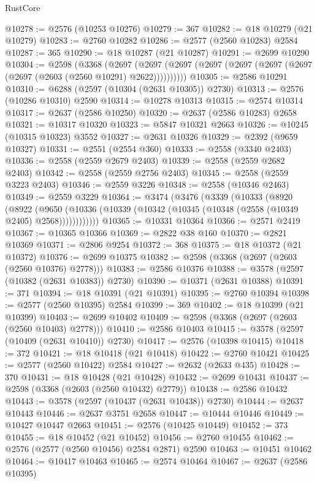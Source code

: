 \begin{lexlean}{RustCore}
\begin{coremodule}
@10278 := @2576 (@10253 @10276)
@10279 := 367
@10282 := @18 @10279 (@21 @10279)
@10283 := @2760 @10282
@10286 := @2577 (@2560 @10283) @2584
@10287 := 365
@10290 := @18 @10287 (@21 @10287)
@10291 := @2699 @10290
@10304 := @2598
    (@3368
      (@2697 (@2697 (@2697 (@2697 (@2697 (@2697 (@2697 (@2697 (@2603 (@2560 @10291) @2622))))))))))
@10305 := @2586 @10291
@10310 := @6288 (@2597 (@10304 (@2631 @10305)) @2730)
@10313 := @2576 (@10286 @10310) @2590
@10314 := @10278 @10313
@10315 := @2574 @10314
@10317 := @2637 (@2586 @10250)
@10320 := @2637 (@2586 @10283) @2658
@10321 := @10317 @10320
@10323 := @5847 @10321 @2663
@10326 := @10245 (@10315 @10323) @3552
@10327 := @2631 @10326
@10329 := @2392 (@9659 @10327)
@10331 := @2551 (@2554 @360)
@10333 := @2558 (@3340 @2403)
@10336 := @2558 (@2559 @2679 @2403)
@10339 := @2558 (@2559 @2682 @2403)
@10342 := @2558 (@2559 @2756 @2403)
@10345 := @2558 (@2559 @3223 @2403)
@10346 := @2559 @3226
@10348 := @2558 (@10346 @2463)
@10349 := @2559 @3229
@10364 := @3474
    (@3476
      (@3339
        (@10333
          (@8920
            (@8922
              (@9650 (@10336 (@10339 (@10342 (@10345 (@10348 (@2558 (@10349 @2405) @2568))))))))))))
@10365 := @10331 @10364
@10366 := @2571 @2419
@10367 := @10365 @10366
@10369 := @2822 @38 @160
@10370 := @2821 @10369
@10371 := @2806 @9254
@10372 := 368
@10375 := @18 @10372 (@21 @10372)
@10376 := @2699 @10375
@10382 := @2598 (@3368 (@2697 (@2603 (@2560 @10376) @2778)))
@10383 := @2586 @10376
@10388 := @3578 (@2597 (@10382 (@2631 @10383)) @2730)
@10390 := @10371 (@2631 @10388)
@10391 := 371
@10394 := @18 @10391 (@21 @10391)
@10395 := @2760 @10394
@10398 := @2577 (@2560 @10395) @2584
@10399 := 369
@10402 := @18 @10399 (@21 @10399)
@10403 := @2699 @10402
@10409 := @2598 (@3368 (@2697 (@2603 (@2560 @10403) @2778)))
@10410 := @2586 @10403
@10415 := @3578 (@2597 (@10409 (@2631 @10410)) @2730)
@10417 := @2576 (@10398 @10415)
@10418 := 372
@10421 := @18 @10418 (@21 @10418)
@10422 := @2760 @10421
@10425 := @2577 (@2560 @10422) @2584
@10427 := @2632 (@2633 @435)
@10428 := 370
@10431 := @18 @10428 (@21 @10428)
@10432 := @2699 @10431
@10437 := @2598 (@3368 (@2603 (@2560 @10432) @2779))
@10438 := @2586 @10432
@10443 := @3578 (@2597 (@10437 (@2631 @10438)) @2730)
@10444 := @2637 @10443
@10446 := @2637 @3751 @2658
@10447 := @10444 @10446
@10449 := @10427 @10447 @2663
@10451 := @2576 (@10425 @10449)
@10452 := 373
@10455 := @18 @10452 (@21 @10452)
@10456 := @2760 @10455
@10462 := @2576 (@2577 (@2560 @10456) @2584 @2871) @2590
@10463 := @10451 @10462
@10464 := @10417 @10463
@10465 := @2574 @10464
@10467 := @2637 (@2586 @10395)

\end{coremodule}
\end{lexlean}
